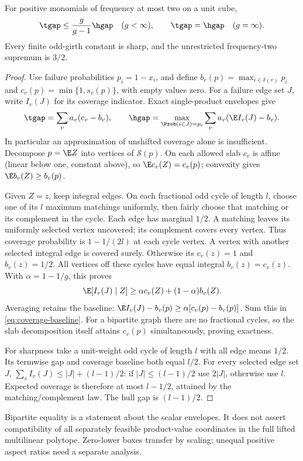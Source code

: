 \begin{theorem}\label{thm:frequency-two}
For positive monomials of frequency at most two on a unit cube,
\[
 \tgap\le\frac{g}{g-1}\hgap\quad(g<\infty),
 \qquad \tgap=\hgap\quad(g=\infty).
\]
Every finite odd-girth constant is sharp, and the unrestricted
frequency-two supremum is $3/2$.
\end{theorem}
\begin{proof}
Use failure probabilities $p_i=1-x_i$, and define
$b_v(p)=\max_{i\in\delta(v)}p_i$ and $c_v(p)=\min\{1,s_v(p)\}$,
with empty values zero. For a failure edge set $J$, write $I_v(J)$ for
its coverage indicator. Exact single-product envelopes give
\begin{equation}\label{eq:coverage-baseline}
 \tgap=\sum_v a_v(c_v-b_v),\qquad
 \hgap=\max_{\Prob(i\in J)=p_i}\sum_v a_v(\E I_v(J)-b_v).
\end{equation}
In particular an approximation of unshifted coverage alone is insufficient.
Decompose $p=\E Z$ into vertices of $\mathcal S(p)$. On each allowed
slab $c_v$ is affine (linear below one, constant above), so
$\E c_v(Z)=c_v(p)$; convexity gives $\E b_v(Z)\ge b_v(p)$.

Given $Z=z$, keep integral edges. On each fractional odd cycle of length
$l$, choose one of its $l$ maximum matchings uniformly, then fairly
choose that matching or its complement in the cycle. Each edge has
marginal $1/2$. A matching leaves its uniformly selected vertex uncovered;
its complement covers every vertex. Thus coverage probability is
$1-1/(2l)$ at each cycle vertex. A vertex with another selected integral
edge is covered surely. Otherwise its $c_v(z)=1$ and $b_v(z)=1/2$.
All vertices off these cycles have equal integral $b_v(z)=c_v(z)$.
With $\alpha=1-1/g$, this proves
\[
 \E[I_v(J)\mid Z]\ge\alpha c_v(Z)+(1-\alpha)b_v(Z).
\]
Averaging retains the baseline:
$\E I_v(J)-b_v(p)\ge\alpha[c_v(p)-b_v(p)]$.
Sum this in \eqref{eq:coverage-baseline}. For a bipartite graph there
are no fractional cycles, so the slab decomposition itself attains
$c_v(p)$ simultaneously, proving exactness.

For sharpness take a unit-weight odd cycle of length $l$ with all edge
means $1/2$. Its termwise gap and coverage baseline both equal $l/2$.
For every selected edge set $J$,
$\sum_vI_v(J)\le|J|+(l-1)/2$: if $|J|\le(l-1)/2$ use $2|J|$,
otherwise use $l$. Expected coverage is therefore at most $l-1/2$,
attained by the matching/complement law. The hull gap is $(l-1)/2$.
\end{proof}
Bipartite equality is a statement about the scalar envelopes. It does
not assert compatibility of all separately feasible product-value
coordinates in the full lifted multilinear polytope. Zero-lower boxes
transfer by scaling; unequal positive aspect ratios need a separate analysis.

